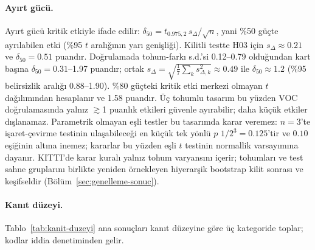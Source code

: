 \documentclass[pdflatex,iicol,sn-mathphys-num]{sn-jnl}
\begin{document}
\paragraph{Ayırt gücü.}
Ayırt gücü kritik etkiyle ifade edilir: $\delta_{50}=t_{0.975,2}\,s_\Delta/\sqrt n$, yani \%50 güçte ayrılabilen etki (\%95 $t$ aralığının yarı genişliği). Kilitli testte H03 için $s_\Delta\approx0.21$ ve $\delta_{50}=0.51$ puandır. Doğrulamada tohum-farkı s.d.'si 0.12--0.79 olduğundan kart başına $\delta_{50}=0.31$--1.97 puandır; ortak $s_\Delta=\sqrt{\tfrac17\sum_k s_{\Delta,k}^2}\approx0.49$ ile $\delta_{50}\approx1.2$ (\%95 belirsizlik aralığı 0.88--1.90). \%80 güçteki kritik etki merkezi olmayan $t$ dağılımından hesaplanır ve 1.58 puandır. Üç tohumlu tasarım bu yüzden VOC doğrulamasında yalnız $\gtrsim$1 puanlık etkileri güvenle ayırabilir; daha küçük etkiler dışlanamaz. Parametrik olmayan eşli testler bu tasarımda karar veremez: $n=3$'te işaret-çevirme testinin ulaşabileceği en küçük tek yönlü $p$ $1/2^3=0.125$'tir ve $0.10$ eşiğinin altına inemez; kararlar bu yüzden eşli $t$ testinin normallik varsayımına dayanır. KITTI'de karar kuralı yalnız tohum varyansını içerir; tohumları ve test sahne gruplarını birlikte yeniden örnekleyen hiyerarşik bootstrap kilit sonrası ve keşifseldir (Bölüm~\ref{sec:genelleme-sonuc}).

\paragraph{Kanıt düzeyi.}
Tablo~\ref{tab:kanit-duzeyi} ana sonuçları kanıt düzeyine göre üç kategoride toplar; kodlar iddia denetiminden gelir.
\end{document}
